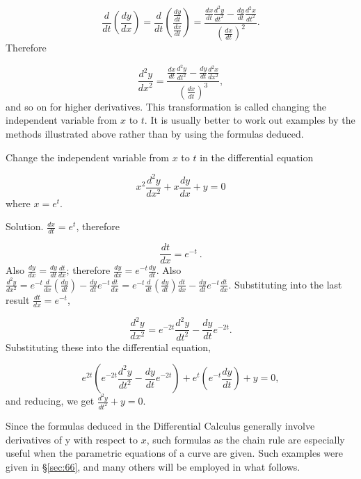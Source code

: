 \[
\frac{d}{dt} \left( \frac{dy}{dx} \right) 
= \frac{d}{dt} \left( \frac{ \frac{dy}{dt} }{ \frac{dx}{dt} } \right) 	
= \frac{ \frac{dx}{dt} \frac{d^2 y}{dt^2} 
- \frac{dy}{dt} \frac{d^2 x}{dt^2} }{ \left( \frac{dx}{dt} \right)^2 }.
\]
Therefore

\begin{equation}
\frac{d^2 y}{dx^2} 	
= \frac{ \frac{dx}{dt} \frac{d^2 y}{dt^2} 
 - \frac{dy}{dt} \frac{d^2 x}{dx^2} }{ \left( \frac{dx}{dt} \right)^3},
\label{eqn:B-97}
\end{equation}
and so on for higher derivatives. This transformation is called 
changing the independent variable from $x$ to $t$. It is usually 
better to work out examples by the methods illustrated above 
rather than by using the formulas deduced.

\begin{example}
{\rm
Change the independent variable from $x$ to $t$ in the
differential equation

\[
x^2 \frac{d^2 y}{dx^2} + x \frac{dy}{dx} + y = 0
\]
where %
$ x 	= e^t$.

Solution. $\frac{dx}{dt}= e^t$, therefore

\[
\frac{dt}{dx} 	= e^{-t}\ .
\]
Also $\frac{dy}{dx} 	= \frac{dy}{dt} \frac{dt}{dx}$; 
therefore %
$\frac{dy}{dx} 	= e^{-t} \frac{dy}{dt}$.
Also 	
$\frac{d^2 y}{dx^2} 
= e^{-t} \frac{d}{dx} \left( \frac{dy}{dt} \right) 
- \frac{dy}{dt} e^{-t} \frac{dt}{dx} 	
= e^{-t} \frac{d}{dt} \left( \frac{dy}{dt} \right) \frac{dt}{dx} 
- \frac{dy}{dt} e^{-t} \frac{dt}{dx}$.
Substituting into the last result $\frac{dt}{dx}= e^{-t}$, 

\[
\frac{d^2 y}{dx^2} 	
= e^{-2t} \frac{d^2 y}{dt^2} - \frac{dy}{dt} e^{-2t}.
\]
Substituting these into the differential equation, %

\[
e^{2t} \left( e^{-2t} \frac{d^2 y}{dt^2} 
- \frac{dy}{dt} e^{-2t} \right) 
+ e^t \left( e^{-t} \frac{dy}{dt} \right) + y = 0,
\]
and reducing, we get $\frac{d^2 y}{dt^2} + y 	= 0$. 

}
\end{example}

Since the formulas deduced in the Differential Calculus 
generally involve derivatives of y with respect to $x$, such 
formulas as the chain rule %
are especially useful when the parametric 
equations of a curve are given. Such examples were given in \S \ref{sec:66},
and many others will be employed in what follows.

